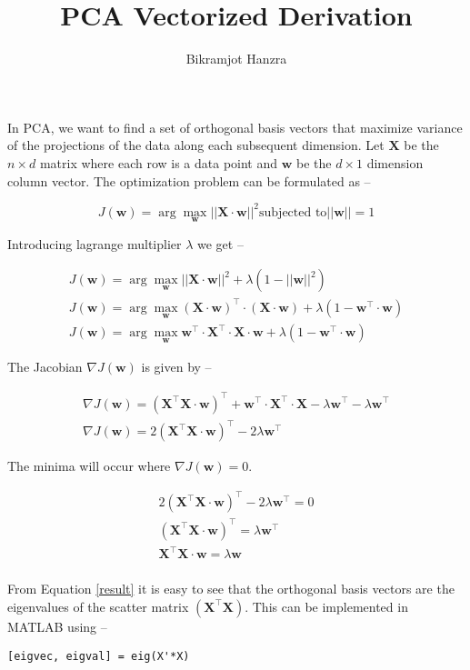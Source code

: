 \documentclass{article}
\title{PCA Vectorized Derivation}
\author{Bikramjot Hanzra}
\date{}
\begin{document}
\maketitle

In PCA, we want to find a set of orthogonal basis vectors that maximize variance of the projections of the data along each subsequent dimension. Let $\mathbf{X}$ be the $n \times d$ matrix where each row is a data point and $\mathbf{w}$ be the $d \times 1$ dimension column vector. The optimization problem can be formulated as --

\begin{equation}
J(\mathbf{w}) = \arg \max_{\mathbf{w}} ||\mathbf{X \cdot w}||^2 \text{subjected to} ||\mathbf{w}|| = 1
\end{equation}

Introducing lagrange multiplier $\lambda$ we get --

\begin{align}
J(\mathbf{w}) = \arg \max_{\mathbf{w}} ||\mathbf{X \cdot w}||^2 + \lambda(1 - ||\mathbf{w}||^2) \\
J(\mathbf{w}) = \arg \max_{\mathbf{w}} \mathbf{(X \cdot w)^\intercal } \cdot \mathbf{(X \cdot w)} + \lambda(1-\mathbf{w^\intercal} \cdot \mathbf{w})  \\
J(\mathbf{w}) = \arg \max_{\mathbf{w}} \mathbf{w^\intercal \cdot X^\intercal \cdot X \cdot w} + \lambda(1-\mathbf{w^\intercal} \cdot \mathbf{w})  
\end{align}

The Jacobian $\nabla J(\mathbf{w})$ is given by --

\begin{align}
\nabla J(\mathbf{w}) =  \mathbf{(X^\intercal X \cdot w)}^\intercal + \mathbf{w^\intercal \cdot X^\intercal \cdot X} -\lambda \mathbf{w^\intercal} - \lambda \mathbf{w^\intercal} \\
\nabla J(\mathbf{w}) =  2\mathbf{(X^\intercal X \cdot w)}^\intercal -2\lambda \mathbf{w^\intercal} 
\end{align}
 
The minima will occur where $\nabla J(\mathbf{w}) = 0$.

\begin{align}
2\mathbf{(X^\intercal X \cdot w)}^\intercal -2\lambda \mathbf{w^\intercal} = 0 \\
\mathbf{(X^\intercal X \cdot w)}^\intercal = \lambda \mathbf{w^\intercal} \\
\mathbf{X^\intercal X \cdot w} = \lambda \mathbf{w} \label{result}\\
\end{align}

From Equation \ref{result} it is easy to see that the orthogonal basis vectors are the eigenvalues of the scatter matrix $\mathbf{(X^\intercal X)}$. This can be implemented in MATLAB using --

\begin{lstlisting}
[eigvec, eigval] = eig(X'*X)
\end{lstlisting}
\end{document}
